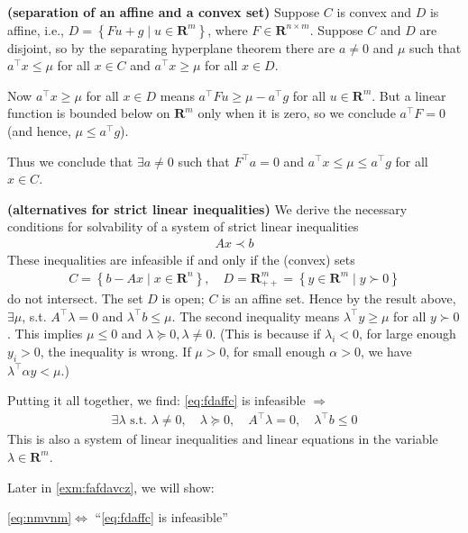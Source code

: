 \documentclass{article}
\newcommand{\bfs}[1]{\textbf{({#1}) }}
\begin{document}
\begin{exma}{\bfs{separation of an affine and a convex set}}\label{exm:mnm}
   Suppose $C$ is convex and $D$ is affine, i.e., $D=\left\{F u+g \mid u \in \mathbf{R}^{m}\right\}$, where $F \in \mathbf{R}^{n \times m} .$ Suppose $C$ and $D$ are disjoint, so by the separating hyperplane theorem there are $a \neq 0$ and $\mu$ such that $a^{\top} x \leq \mu$ for all $x \in C$ and $a^{\top} x \geq \mu$ for all $x \in D$.
   
Now $a^{\top} x \geq \mu$ for all $x \in D$ means $a^{\top} F u \geq \mu-a^{\top} g$ for all $u \in \mathbf{R}^{m}$. But a linear function is bounded below on $\mathbf{R}^{m}$ only when it is zero, so we conclude $a^{\top} F=0$ (and hence, $\mu \leq a^{\top} g$).

Thus we conclude that $\exists a \neq 0$ such that $F^{\top} a=0$ and $a^{\top} x \leq \mu \leq a^{\top} g$ for all $x \in C$.
\end{exma}
\begin{exma}{\bfs{alternatives for strict linear inequalities}}\label{exm:mnm1}
 We derive the necessary conditions for solvability of a system of strict linear inequalities
\begin{align}
A x \prec b\label{eq:fdaffc}
\end{align}
These inequalities are infeasible if and only if the (convex) sets
\begin{align*}
C=\left\{b-A x \mid x \in \mathbf{R}^{n}\right\}, \quad D=\mathbf{R}_{++}^{m}=\left\{y \in \mathbf{R}^{m} \mid y \succ 0\right\}
\end{align*}
do not intersect. The set $D$ is open; $C$ is an affine set. Hence by the result above, $\exists \mu$, s.t. $A^{\top} \lambda=0$ and $\lambda^{\top} b \leq \mu .$ The second inequality means $\lambda^{\top} y \geq \mu$ for all $y \succ 0$. This implies $\mu \leq 0$ and $\lambda \succeq 0, \lambda \neq 0$. (This is because if $\lambda_i<0$, for large enough $y_i>0$, the inequality is wrong. If $\mu > 0$, for small enough $\alpha>0$, we have  $\lambda^{\top} \alpha y < \mu$.)

Putting it all together, we find: \cref{eq:fdaffc} is infeasible $\Longrightarrow$
\begin{align}
 \exists \lambda \text{ s.t. } \lambda \neq 0, \quad \lambda \succeq 0, \quad A^{\top} \lambda=0, \quad \lambda^{\top} b \leq 0\label{eq:nmvnm}
\end{align}
This is also a system of linear inequalities and linear equations in the variable $\lambda \in \mathbf{R}^{m}$. 
\end{exma}
\begin{rema}
Later in \cref{exm:fafdavcz}, we will show:

\centerline{\cref{eq:nmvnm}$\Longleftrightarrow$ ``\cref{eq:fdaffc} is infeasible''}
\end{rema}
\end{document}
